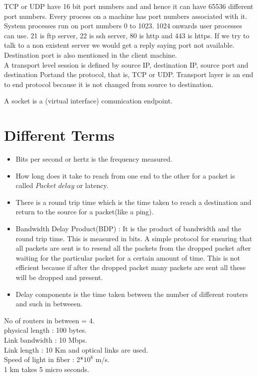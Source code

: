 \documentclass[solution,addpoints,12pt]{exam}
\begin{document}
TCP or UDP have 16 bit port numbers and and hence it can have 65536 different
port numbers. Every process
on a machine has port numbers associated with it. System processes run on port
numbers 0 to 1023. 1024 onwards user processes can use. 21 is ftp server, 22 is
ssh server, 80 is http
and 443 is https. If we try to talk to a non existent server we would get a
reply saying port not available. Destination port is also mentioned in the
client machine.\\

A transport level session is defined by source IP, destination IP, source port
and destination Portand the protocol, that is, TCP or UDP. Transport layer is
an end to end protocol because it is not changed from source to destination.

A socket is a (virtual interface) comunication endpoint.
\section{Different Terms}
\begin{itemize}
\item
Bits per second or hertz
is the frequency measured.
\item
How long does it take to reach from one end to the other
for a packet
is called $Packet$ $delay$ or latency.\\
\item
There is a round trip time which is the time taken to reach a destination
and return to the source for a packet(like a ping).
\item
Bandwidth Delay Product(BDP) : It is the product of bandwidth and the round
trip time.
This is measured in bits. A simple protocol for ensuring that all packets are
sent
is to resend all the packets from the dropped packet after waiting for the
particular packet for a certain amount of time. This is not efficient because
if after the dropped packet many packets are sent all these will be dropped
and present.
\item
Delay components is the time taken between the number of different routers and
such in betweeen.\\
\end{itemize}

No of routers in between = 4.\\
physical length : 100 bytes.\\
Link bandwidth : 10 Mbps.\\
Link length : 10 Km and optical links are used.\\
Speed of light in fiber : 2*$10^8$ m/s.\\
1 km takes 5 micro seconds.
\end{document}
